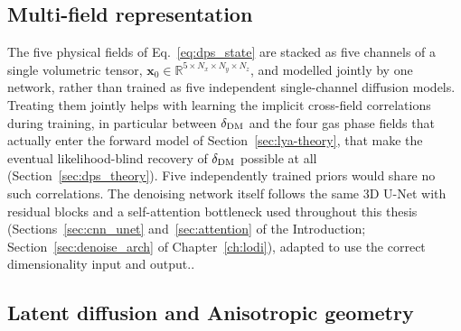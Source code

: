 \subsection{Multi-field representation}
\label{sec:dps_multifield}

The five physical fields of Eq.~\ref{eq:dps_state} are stacked as five channels of a single volumetric tensor, $\bm{x}_0 \in \mathbb{R}^{5\times N_x\times N_y\times N_z}$, and modelled jointly by one network, rather than trained as five independent single-channel diffusion models. Treating them jointly helps with learning the implicit cross-field correlations during training, in particular between $\delta_{\rm DM}$ and the four gas phase fields that actually enter the forward model of Section~\ref{sec:lya-theory}, that make the eventual likelihood-blind recovery of $\delta_{\rm DM}$ possible at all (Section~\ref{sec:dps_theory}). Five independently trained priors would share no such correlations. The denoising network itself follows the same 3D U-Net with residual blocks and a self-attention bottleneck used throughout this thesis (Sections~\ref{sec:cnn_unet} and~\ref{sec:attention} of the Introduction; Section~\ref{sec:denoise_arch} of Chapter~\ref{ch:lodi}), adapted to use the correct dimensionality input and output..

\subsection{Latent diffusion and Anisotropic geometry}
\label{sec:dps_latent}

